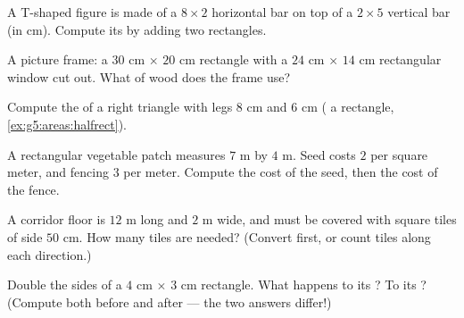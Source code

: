 \begin{exercise}[$\star$]\label{exo:g5:areas:6}
A T-shaped figure is made of a $8 \times 2$ horizontal bar on top of
a $2 \times 5$ vertical bar (in cm). Compute its  by adding two
rectangles.
\end{exercise}

\begin{exercise}[$\star$]\label{exo:g5:areas:7}
A picture frame: a $30$ cm $\times$ $20$ cm rectangle with a
$24$ cm $\times$ $14$ cm rectangular window cut out. What  of
wood does the frame use?
\end{exercise}

\begin{exercise}[$\star$]\label{exo:g5:areas:8}
Compute the  of a right triangle with legs $8$ cm and $6$ cm
( a rectangle, \cref{ex:g5:areas:halfrect}).
\end{exercise}

\begin{exercise}[$\star$]\label{exo:g5:areas:9}
A rectangular vegetable patch measures $7$ m by $4$ m. Seed costs
$2$ per square meter, and fencing $3$ per meter. Compute the cost of
the seed, then the cost of the fence.
\end{exercise}

\begin{exercise}[$\star\star$]\label{exo:g5:areas:10}
A corridor floor is $12$ m long and $2$ m wide, and must be covered
with square tiles of side $50$ cm. How many tiles are needed?
(Convert first, or count tiles along each direction.)
\end{exercise}

\begin{exercise}[$\star\star$]\label{exo:g5:areas:11}
Double the sides of a $4$ cm $\times$ $3$ cm rectangle. What happens
to its ? To its ? (Compute both before and after ---
the two answers differ!)
\end{exercise}
